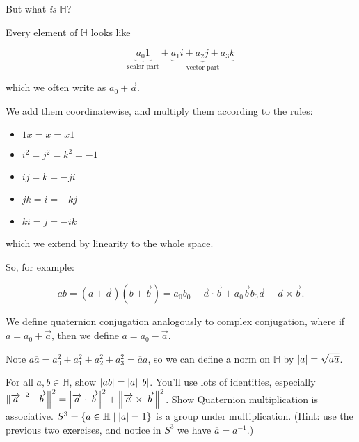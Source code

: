 \documentclass[../main.tex]{subfiles}
\begin{document}
But what \emph{is} $\mathbb{H}$?

Every element of $\mathbb{H}$ looks like 

\[
  \underbrace{a_0 1}_{\text{scalar part}} + \underbrace{a_1 i + a_2 j + a_3 k}_{\text{vector part}}
\] 

which we often write as $a_0 + \overrightarrow{a}$. 

We add them coordinatewise, and multiply them according to the rules:

\begin{itemize}
  \item $1 x = x = x 1$
  \item $i^2 = j^2 = k^2 = -1$
  \item $ij = k = - ji$
  \item $jk = i = - kj$
  \item $ki = j = - ik$
\end{itemize}

which we extend by linearity to the whole space. 

So, for example:

\[ ab = (a + \overrightarrow{a})(b + \overrightarrow{b}) 
      = a_0b_0 - \overrightarrow{a} \cdot \overrightarrow{b} + a_0 \overrightarrow{b} b_0 \overrightarrow{a} + \overrightarrow{a} \times \overrightarrow{b}.
\]

We define quaternion conjugation analogously to complex conjugation, where if
$a = a_0 + \overrightarrow{a}$, then we define $\overline{a} = a_0 - \overrightarrow{a}$.

Note $a \overline{a} = a_0^2 + a_1^2 + a_2^2 + a_3^2 = \overline{a} a$, so we
can define a norm on $\mathbb{H}$ by $\left \lvert a \right \rvert = \sqrt{a \overline{a}}$.

\begin{ExerciseList}
  \Exercise For all $a,b \in \mathbb{H}$, show $\left \lvert ab \right \rvert = \left \lvert a \right \rvert \left \lvert b \right \rvert$. 
  You'll use lots of identities, especially 
  $\left \lVert \overrightarrow{a} \right \rVert^2 \left \lVert \overrightarrow{b} \right \rVert^2 = \left \lvert \overrightarrow{a} \cdot \overrightarrow{b} \right \rvert^2 + \left \lVert \overrightarrow{a} \times \overrightarrow{b} \right \rVert^2$.
  \Exercise Show Quaternion multiplication is associative.
  \Exercise $S^3 = \{ a \in \mathbb{H} \mid \left \lvert a \right \rvert = 1 \}$ is a group under multiplication. 
  (Hint: use the previous two exercises, and notice in $S^3$ we have $\overline{a} = a^{-1}$.)
\end{ExerciseList}

\end{document}
